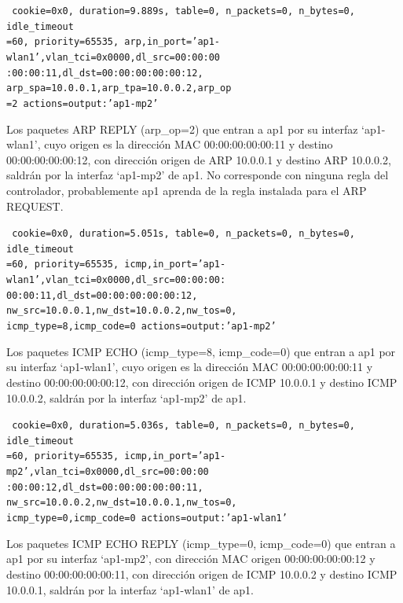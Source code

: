 \documentclass[a4paper,12pt,twoside,spanish]{book}
\begin{document}
\noindent\texttt{
	cookie=0x0, duration=9.889s, table=0, n\_packets=0, n\_bytes=0, idle\_timeout\\
	=60, priority=65535,
	arp,in\_port='ap1-wlan1',vlan\_tci=0x0000,dl\_src=00:00:00\\
	:00:00:11,dl\_dst=00:00:00:00:00:12,
	arp\_spa=10.0.0.1,arp\_tpa=10.0.0.2,arp\_op\\
	=2 actions=output:'ap1-mp2'
}

Los paquetes ARP REPLY (arp\_op=2) que entran a ap1 por su interfaz ‘ap1-wlan1’, cuyo origen es la dirección MAC 00:00:00:00:00:11 y destino 00:00:00:00:00:12, con dirección origen de ARP 10.0.0.1 y destino ARP 10.0.0.2, saldrán por la interfaz ‘ap1-mp2’ de ap1. No corresponde con ninguna regla del controlador, probablemente ap1 aprenda de la regla instalada para el ARP REQUEST.\par 

\noindent\texttt{
	cookie=0x0, duration=5.051s, table=0, n\_packets=0, n\_bytes=0, idle\_timeout\\
	=60, priority=65535,
	icmp,in\_port='ap1-wlan1',vlan\_tci=0x0000,dl\_src=00:00:00:\\
	00:00:11,dl\_dst=00:00:00:00:00:12,
	nw\_src=10.0.0.1,nw\_dst=10.0.0.2,nw\_tos=0,\\
	icmp\_type=8,icmp\_code=0 actions=output:'ap1-mp2'
}

Los paquetes ICMP ECHO (icmp\_type=8, icmp\_code=0) que entran a ap1 por su interfaz ‘ap1-wlan1’, cuyo origen es la dirección MAC 00:00:00:00:00:11 y destino 00:00:00:00:00:12, con dirección origen de ICMP 10.0.0.1 y destino ICMP 10.0.0.2, saldrán por la interfaz ‘ap1-mp2’ de ap1.\par 

\noindent\texttt{
	cookie=0x0, duration=5.036s, table=0, n\_packets=0, n\_bytes=0, idle\_timeout\\
	=60, priority=65535,
	icmp,in\_port='ap1-mp2',vlan\_tci=0x0000,dl\_src=00:00:00\\
	:00:00:12,dl\_dst=00:00:00:00:00:11,
	nw\_src=10.0.0.2,nw\_dst=10.0.0.1,nw\_tos=0,\\
	icmp\_type=0,icmp\_code=0 actions=output:'ap1-wlan1'
}

Los paquetes ICMP ECHO REPLY (icmp\_type=0, icmp\_code=0) que entran a ap1 por su interfaz ‘ap1-mp2’, con dirección MAC origen 00:00:00:00:00:12 y destino 00:00:00:00:00:11, con dirección origen de ICMP 10.0.0.2 y destino ICMP 10.0.0.1, saldrán por la interfaz ‘ap1-wlan1’ de ap1.\par 
\end{document}
